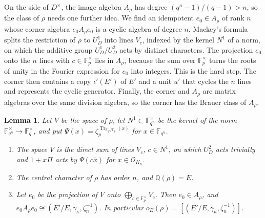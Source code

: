 \documentclass[a4paper,11pt]{amsart}
\newtheorem{lemma}[theorem]{Lemma}
\theoremstyle{definition}
\theoremstyle{remark}
\numberwithin{equation}{section}
\newcommand{\Q}{\mathbb{Q}}
\DeclareMathOperator{\Tr}{Tr}
\newcommand{\F}{\mathbb{F}}
\begin{document}
On the side of $D^\times$, the image algebra $A_\rho$ has degree $(q^n-1)/(q-1)>n$, so the class of $\rho$ needs one further idea. We find an idempotent $e_0\in A_\rho$ of rank $n$ whose corner algebra $e_0A_\rho e_0$ is a cyclic algebra of degree $n$. Mackey's formula splits the restriction of $\rho$ to $U_D^1$ into lines $V_c$, indexed by the kernel $N^1$ of a norm, on which the additive group $U_D^1/U_D^2$ acts by distinct characters. The projection $e_0$ onto the $n$ lines with $c\in\F_p^\times$ lies in $A_\rho$, because the sum over $\F_p^\times$ turns the roots of unity in the Fourier expression for $e_0$ into integers. This is the hard step. The corner then contains a copy $\iota'(E')$ of $E'$ and a unit $u'$ that cycles the $n$ lines and represents the cyclic generator. Finally, the corner and $A_\rho$ are matrix algebras over the same division algebra, so the corner has the Brauer class of $A_\rho$.

\begin{lemma}\label{lem:division-side}
Let $V$ be the space of $\rho$, let $N^1\subset \F_{q^n}^\times$ be the kernel of the norm $\F_{q^n}^\times\to \F_q^\times$, and put $\Psi(x)=\zeta_p^{\Tr_{\F_{q^n}/\F_p}(x)}$ for $x\in \F_{q^n}$.
\begin{enumerate}
\item[(i)] The space $V$ is the direct sum of lines $V_c$, $c\in N^1$, on which $U_D^2$ acts trivially and $1+x\Pi$ acts by $\Psi(c\bar x)$ for $x\in\mathcal O_{K_n}$.
\item[(ii)] The central character of $\rho$ has order $n$, and $\Q(\rho)=E$.
\item[(iii)] Let $e_0$ be the projection of $V$ onto $\bigoplus_{c\in\F_p^\times}V_c$. Then $e_0\in A_\rho$, and $e_0A_\rho e_0\cong(E'/E,\gamma_\kappa,\zeta_n^{-1})$. In particular $o_E(\rho)=[(E'/E,\gamma_\kappa,\zeta_n^{-1})]$.
\end{enumerate}
\end{lemma}
\end{document}

